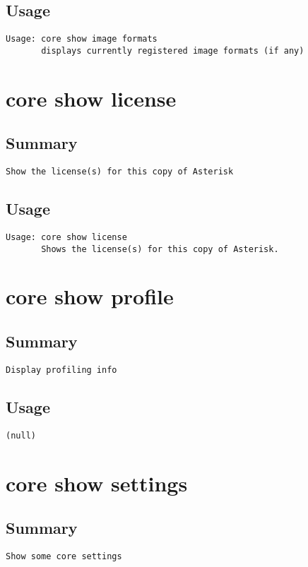\subsection{Usage}
\begin{verbatim}
Usage: core show image formats
       displays currently registered image formats (if any)

\end{verbatim}


\section{core show license}
\subsection{Summary}
\begin{verbatim}
Show the license(s) for this copy of Asterisk
\end{verbatim}
\subsection{Usage}
\begin{verbatim}
Usage: core show license
       Shows the license(s) for this copy of Asterisk.

\end{verbatim}


\section{core show profile}
\subsection{Summary}
\begin{verbatim}
Display profiling info
\end{verbatim}
\subsection{Usage}
\begin{verbatim}
(null)
\end{verbatim}


\section{core show settings}
\subsection{Summary}
\begin{verbatim}
Show some core settings
\end{verbatim}

